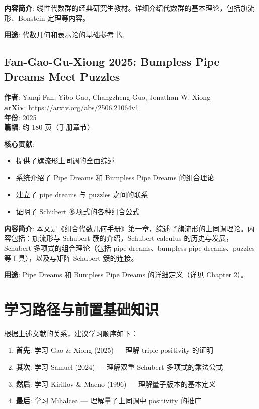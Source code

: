 \textbf{内容简介}: 线性代数群的经典研究生教材。详细介绍代数群的基本理论，包括旗流形、Bonstein 定理等内容。

\textbf{用途}: 代数几何和表示论的基础参考书。

\subsection{Fan-Gao-Gu-Xiong 2025: Bumpless Pipe Dreams Meet Puzzles}
\textbf{作者}: Yanqi Fan, Yibo Gao, Changzheng Guo, Jonathan W. Xiong \\
\textbf{arXiv}: \url{https://arxiv.org/abs/2506.21064v1} \\
\textbf{年份}: 2025 \\
\textbf{篇幅}: 约 180 页（手册章节）

\textbf{核心贡献}:
\begin{itemize}
\item 提供了旗流形上同调的全面综述
\item 系统介绍了 Pipe Dreams 和 Bumpless Pipe Dreams 的组合理论
\item 建立了 pipe dreams 与 puzzles 之间的联系
\item 证明了 Schubert 多项式的各种组合公式
\end{itemize}

\textbf{内容简介}: 本文是《组合代数几何手册》第一章，综述了旗流形的上同调理论。内容包括：旗流形与 Schubert 簇的介绍，Schubert calculus 的历史与发展，Schubert 多项式的组合理论（包括 pipe dreams、bumpless pipe dreams、puzzles 等工具），以及与矩阵 Schubert 簇的连接。

\textbf{用途}: Pipe Dreams 和 Bumpless Pipe Dreams 的详细定义（详见 Chapter 2）。

\section{学习路径与前置基础知识}

根据上述文献的关系，建议学习顺序如下：

\begin{enumerate}
\item \textbf{首先}: 学习 Gao \& Xiong (2025) — 理解 triple positivity 的证明
\item \textbf{其次}: 学习 Samuel (2024) — 理解双重 Schubert 多项式的乘法公式
\item \textbf{然后}: 学习 Kirillov \& Maeno (1996) — 理解量子版本的基本定义
\item \textbf{最后}: 学习 Mihalcea — 理解量子上同调中 positivity 的推广
\end{enumerate}

